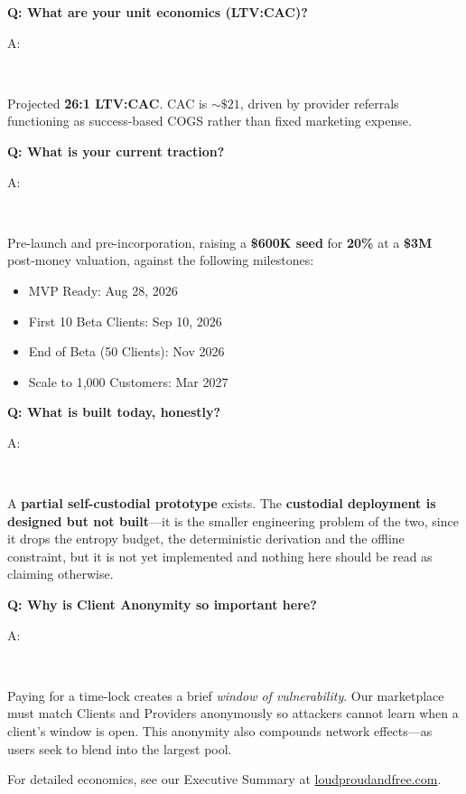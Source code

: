 \documentclass[12pt,a4paper]{article}
\newenvironment{question}[1]{%
  \vspace{0.8em}\noindent\textbf{Q: #1}\par
  \vspace{0.2em}\noindent\begin{itshape}A:\end{itshape}~%
}{\vspace{0.8em}}
\begin{document}
\begin{question}{What are your unit economics (LTV:CAC)?}
Projected \textbf{\~26:1 LTV:CAC}. CAC is $\sim\$21$, driven by provider referrals functioning as success-based COGS rather than fixed marketing expense.
\end{question}

\begin{question}{What is your current traction?}
Pre-launch and pre-incorporation, raising a \textbf{\$600K seed} for \textbf{20\%} at a \textbf{\$3M} post-money valuation, against the following milestones:
\begin{itemize}
  \item MVP Ready: Aug 28, 2026
  \item First 10 Beta Clients: Sep 10, 2026
  \item End of Beta (50 Clients): Nov 2026
  \item Scale to 1,000 Customers: Mar 2027
\end{itemize}
\end{question}

\begin{question}{What is built today, honestly?}
A \textbf{partial self-custodial prototype} exists. The \textbf{custodial deployment is designed but not built}---it is the smaller engineering problem of the two, since it drops the entropy budget, the deterministic derivation and the offline constraint, but it is not yet implemented and nothing here should be read as claiming otherwise.
\end{question}

\begin{question}{Why is Client Anonymity so important here?}
Paying for a time-lock creates a brief \emph{window of vulnerability}. Our marketplace must match Clients and Providers anonymously so attackers cannot learn when a client's window is open. This anonymity also compounds network effects—as users seek to blend into the largest pool.
\end{question}

\vspace{0.6em}
For detailed economics, see our Executive Summary at \href{https://loudproudandfree.com}{loudproudandfree.com}.
\end{document}
